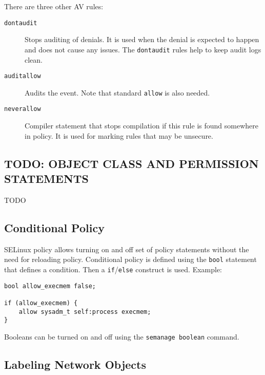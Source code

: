 There are three other AV rules:
\begin{description}
    \item [\texttt{dontaudit}] Stops auditing of denials. It is used when the
        denial is expected to happen and does not cause any issues. The
        \texttt{dontaudit} rules help to keep audit logs clean.
    \item [\texttt{auditallow}] Audits the event. Note that standard
        \texttt{allow} is also needed.
    \item [\texttt{neverallow}] Compiler statement that stops compilation if
        this rule is found somewhere in policy. It is used for marking rules
        that may be unsecure.
\end{description}

\subsection{TODO: OBJECT CLASS AND PERMISSION STATEMENTS}

TODO

\subsection{Conditional Policy}

SELinux policy allows turning on and off set of policy statements without the
need for reloading policy. Conditional policy is defined using the \texttt{bool}
statement that defines a condition. Then a \texttt{if}/\texttt{else} construct
is used. Example:
\begin{lstlisting}
bool allow_execmem false;

if (allow_execmem) {
    allow sysadm_t self:process execmem;
}
\end{lstlisting}
Booleans can be turned on and off using the \texttt{semanage boolean} command.

\subsection{Labeling Network Objects}

